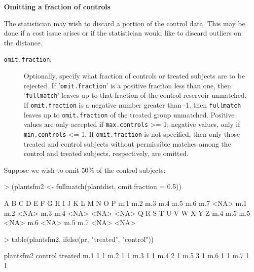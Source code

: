 \documentclass[12pt,twoside]{article}
\begin{document}
{{{{\rmfamily\bfseries
Omitting a fraction of controls}


\bigskip

{\ttfamily
\textrm{ The statistician may wish to discard a portion of the control
data. This may be done if a cost issue arises or if the statistician
would like to discard outliers on the distance.}}


\bigskip

\begin{description}
\item[\texttt{omit.fraction}:] 
Optionally, specify what fraction of controls or treated subjects
are to be rejected.  If '\texttt{omit.fraction}' is a positive 
fraction less than one, then '\texttt{fullmatch}' leaves up 
to that fraction of the control reservoir unmatched.
If \texttt{omit.fraction} is
a negative number greater than {}-1, then \texttt{fullmatch} leaves
up to
{\textbar}\texttt{omit.fraction}{\textbar}
of the treated group unmatched. Positive values are only accepted
if \texttt{max.controls}
{\textgreater}= 1; negative values, only if
\texttt{min.controls} \textless= 1.  If
\texttt{omit.fraction} is not specified, then only those 
treated and control subjects without permissible
matches among the control and treated subjects,
respectively, are omitted.
\end{description}


\bigskip

{\rmfamily
Suppose we wish to omit 50\% of the control subjects: }


\bigskip

\begin{Schunk}
\begin{Sinput}
> (plantsfm2 <- fullmatch(plantdist, omit.fraction = 0.5))
\end{Sinput}
\begin{Soutput}
   A    B    C    D    E    F    G    H    I    J    K    L    M    N    O    P 
 m.1  m.2  m.3  m.4  m.5  m.6  m.7 <NA>  m.1  m.2 <NA>  m.3  m.4 <NA> <NA> <NA> 
   Q    R    S    T    U    V    W    X    Y    Z 
 m.4  m.5  m.5 <NA>  m.6 <NA>  m.5  m.7 <NA> <NA> 
\end{Soutput}
\begin{Sinput}
> table(plantsfm2, ifelse(pr, "treated", "control"))
\end{Sinput}
\begin{Soutput}
plantsfm2 control treated
      m.1       1       1
      m.2       1       1
      m.3       1       1
      m.4       2       1
      m.5       3       1
      m.6       1       1
      m.7       1       1
\end{Soutput}
\end{Schunk}

}}}
\end{document}
